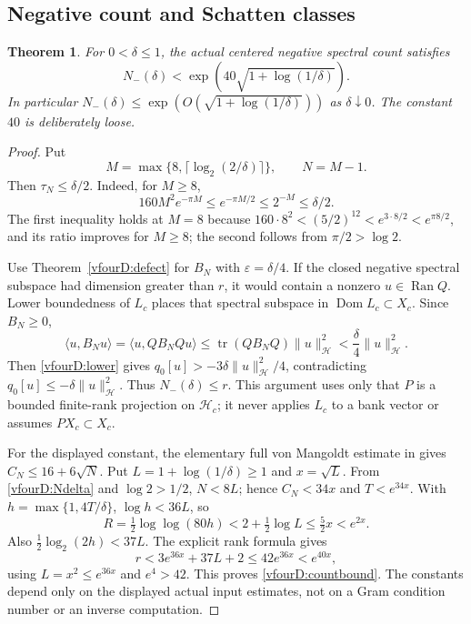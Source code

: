 \documentclass[11pt,a4paper]{article}
\numberwithin{equation}{section}
\newtheorem{theorem}{Theorem}[section]
\theoremstyle{definition}\newtheorem{definition}[theorem]{Definition}
\theoremstyle{remark}\newtheorem{remark}[theorem]{Remark}
\newcommand{\Hh}{\mathcal H}\newcommand{\Hw}{\mathcal H}
\newcommand{\dom}{\operatorname{Dom}}\newcommand{\Var}{\operatorname{Var}}
\newcommand{\ip}[2]{\langle#1,#2\rangle}\newcommand{\norm}[1]{\lVert#1\rVert}\newcommand{\abs}[1]{\lvert#1\rvert}
\begin{document}
\subsection{Negative count and Schatten classes}\label{vfourD:count}
\begin{theorem}\label{vfourD:main}
For $0<\delta\le1$, the actual centered negative spectral count satisfies
\begin{equation}\label{vfourD:countbound}
 N_-(\delta)<\exp\!\left(40\sqrt{1+\log(1/\delta)}\right).
\end{equation}
In particular $N_-(\delta)\le\exp(O(\sqrt{1+\log(1/\delta)}))$ as $\delta\downarrow0$. The constant $40$ is deliberately loose.
\end{theorem}
\begin{proof}
Put
\begin{equation}\label{vfourD:Ndelta}
 M=\max\{8,\lceil\log_2(2/\delta)\rceil\},\qquad N=M-1.
\end{equation}
Then $\tau_N\le\delta/2$. Indeed, for $M\ge8$,
\[160M^2e^{-\pi M}\le e^{-\pi M/2}\le2^{-M}\le\delta/2.
\]
The first inequality holds at $M=8$ because $160\cdot8^2<(5/2)^{12}<e^{3\cdot8/2}<e^{\pi8/2}$, and its ratio improves for $M\ge8$; the second follows from $\pi/2>\log2$.

Use Theorem~\ref{vfourD:defect} for $B_N$ with $\varepsilon=\delta/4$. If the closed negative spectral subspace had dimension greater than $r$, it would contain a nonzero $u\in\operatorname{Ran}Q$. Lower boundedness of $L_c$ places that spectral subspace in $\dom L_c\subset X_c$. Since $B_N\ge0$,
\[\ip u{B_Nu}=\ip u{QB_NQu}\le\operatorname{tr}(QB_NQ)\norm u_{\Hh}^2<\frac\delta4\norm u_{\Hh}^2.
\]
Then \eqref{vfourD:lower} gives $q_0[u]>-3\delta\norm u_{\Hh}^2/4$, contradicting $q_0[u]\le-\delta\norm u_{\Hh}^2$. Thus $N_-(\delta)\le r$. This argument uses only that $P$ is a bounded finite-rank projection on $\Hh_c$; it never applies $L_c$ to a bank vector or assumes $P X_c\subset X_c$.

For the displayed constant, the elementary full von Mangoldt estimate in \cite{vfourTrace} gives $C_N\le16+6\sqrt N$. Put $L=1+\log(1/\delta)\ge1$ and $x=\sqrt L$. From \eqref{vfourD:Ndelta} and $\log2>1/2$, $N<8L$; hence $C_N<34x$ and $T<e^{34x}$. With $h=\max\{1,4T/\delta\}$, $\log h<36L$, so
\[R=\tfrac12\log\log(80h)<2+\tfrac12\log L\le\tfrac52x<e^{2x}.
\]
Also $\tfrac12\log_2(2h)<37L$. The explicit rank formula gives
\[r<3e^{36x}+37L+2\le42e^{36x}<e^{40x},
\]
using $L=x^2\le e^{36x}$ and $e^4>42$. This proves \eqref{vfourD:countbound}. The constants depend only on the displayed actual input estimates, not on a Gram condition number or an inverse computation.
\end{proof}
\end{document}
